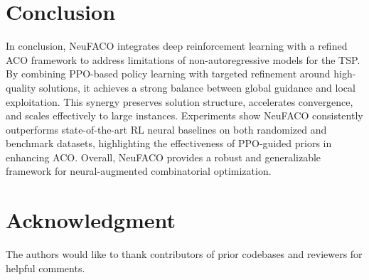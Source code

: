 \documentclass[a4paper,conference]{IEEEtran}
\begin{document}
\section{Conclusion}
In conclusion, NeuFACO integrates deep reinforcement learning with a refined ACO framework to address limitations of non-autoregressive models for the TSP. By combining PPO-based policy learning with targeted refinement around high-quality solutions, it achieves a strong balance between global guidance and local exploitation. This synergy preserves solution structure, accelerates convergence, and scales effectively to large instances. Experiments show NeuFACO consistently outperforms state-of-the-art RL neural baselines on both randomized and benchmark datasets, highlighting the effectiveness of PPO-guided priors in enhancing ACO. Overall, NeuFACO provides a robust and generalizable framework for neural-augmented combinatorial optimization.

\section*{Acknowledgment}
The authors would like to thank contributors of prior codebases and reviewers for helpful comments.



\end{document}
